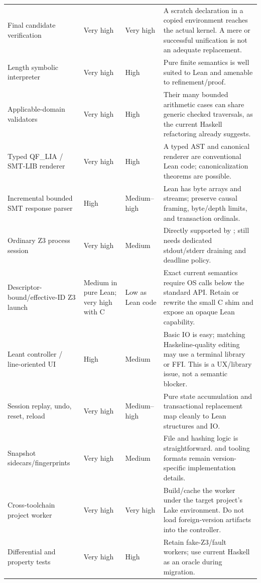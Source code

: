 \documentclass[10pt,letterpaper,oneside]{report}
\newcommand{\code}[1]{\texttt{\detokenize{#1}}}
\begin{document}
\begin{longtable}{@{}L{0.22\textwidth}C{0.11\textwidth}C{0.13\textwidth}L{0.46\textwidth}@{}}
Final candidate verification & Very high & Very high & A scratch declaration in a copied environment reaches the actual kernel. A mere \code{inferType} or successful unification is not an adequate replacement. \\
Length symbolic interpreter & Very high & High & Pure finite semantics is well suited to Lean and amenable to refinement/proof. \\
Applicable-domain validators & Very high & High & Their many bounded arithmetic cases can share generic checked traversals, as the current Haskell refactoring already suggests. \\
Typed QF\_LIA / SMT-LIB renderer & Very high & High & A typed AST and canonical renderer are conventional Lean code; canonicalization theorems are possible. \\
Incremental bounded SMT response parser & High & Medium--high & Lean has byte arrays and streams; preserve causal framing, byte/depth limits, and transaction ordinals. \\
Ordinary Z3 process session & Very high & Medium & Directly supported by \code{IO.Process.spawn}; still needs dedicated stdout/stderr draining and deadline policy. \\
Descriptor-bound/effective-ID Z3 launch & Medium in pure Lean; very high with C & Low as Lean code & Exact current semantics require OS calls below the standard API. Retain or rewrite the small C shim and expose an opaque Lean capability. \\
Leant controller / line-oriented UI & High & Medium & Basic IO is easy; matching Haskeline-quality editing may use a terminal library or FFI. This is a UX/library issue, not a semantic blocker. \\
Session replay, undo, reset, reload & Very high & Medium--high & Pure state accumulation and transactional replacement map cleanly to Lean structures and IO. \\
Snapshot sidecars/fingerprints & Very high & Medium & File and hashing logic is straightforward. \code{.olean} and tooling formats remain version-specific implementation details. \\
Cross-toolchain project worker & Very high & Very high & Build/cache the worker under the target project's Lake environment. Do not load foreign-version artifacts into the controller. \\
Differential and property tests & Very high & High & Retain fake-Z3/fault workers; use current Haskell as an oracle during migration. \\
\bottomrule
\end{longtable}
\end{document}
